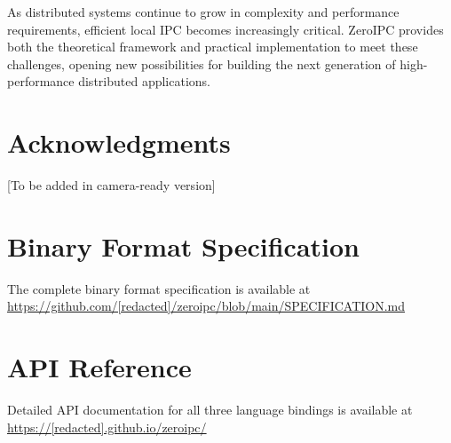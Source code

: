 \documentclass[11pt]{article}
\begin{document}
As distributed systems continue to grow in complexity and performance requirements, efficient local IPC becomes increasingly critical. ZeroIPC provides both the theoretical framework and practical implementation to meet these challenges, opening new possibilities for building the next generation of high-performance distributed applications.

\section*{Acknowledgments}

[To be added in camera-ready version]




\appendix

\section{Binary Format Specification}

The complete binary format specification is available at \url{https://github.com/[redacted]/zeroipc/blob/main/SPECIFICATION.md}

\section{API Reference}

Detailed API documentation for all three language bindings is available at \url{https://[redacted].github.io/zeroipc/}
\end{document}
